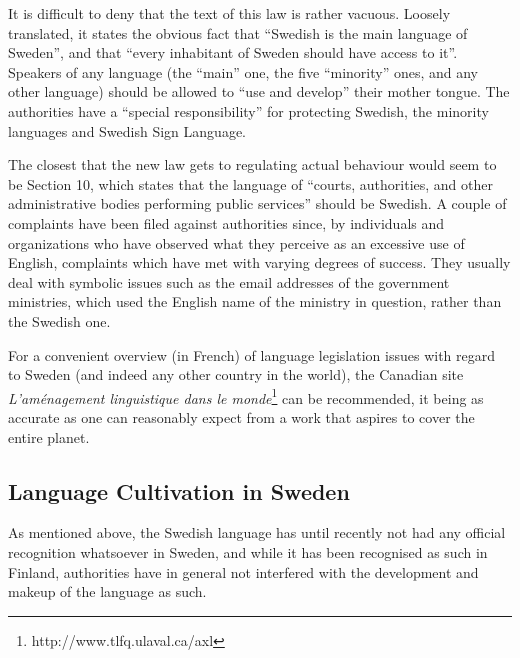 \begin{multicols}{2}
It is difficult to deny that the text of this law is rather
vacuous. Loosely translated, it states the obvious fact that ``Swedish
is the main language of Sweden'', and that ``every inhabitant of Sweden
should have access to it''. Speakers of any language (the ``main'' one,
the five ``minority'' ones, and any other language) should be allowed to
``use and develop'' their mother tongue. The authorities have a ``special
responsibility'' for protecting Swedish, the minority languages and
Swedish Sign Language.

The closest that the new law gets to regulating actual behaviour would
seem to be Section 10, which states that the language of ``courts,
authorities, and other administrative bodies performing public
services'' should be Swedish. A couple of complaints have been filed
against authorities since, by individuals and organizations who have
observed what they perceive as an excessive use of English, complaints
which have met with varying degrees of success. They usually deal with
symbolic issues such as the email addresses of the government
ministries, which used the English name of the ministry in question,
rather than the Swedish one.

For a convenient overview (in French) of language legislation issues
with regard to Sweden (and indeed any other country in the world), the
Canadian site \textit{L'aménagement linguistique dans le
  monde}\footnote{http://www.tlfq.ulaval.ca/axl} can be recommended,
it being as accurate as one can reasonably expect from a work that
aspires to cover the entire planet.

\subsection{Language Cultivation in Sweden}

As mentioned above, the Swedish language has until recently not had
any official recognition whatsoever in Sweden, and while it has been
recognised as such in Finland, authorities have in general not
interfered with the development and makeup of the language as such.



\end{multicols}

